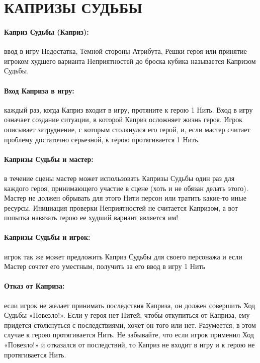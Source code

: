 \section{КАПРИЗЫ СУДЬБЫ}
\paragraph{Каприз Судьбы (Каприз):} ввод в игру Недостатка, Темной стороны Атрибута, Решки героя или принятие игроком худшего варианта Неприятностей до броска кубика называется Капризом Судьбы.
\paragraph{Вход Каприза в игру:} каждый раз, когда Каприз входит в игру, протяните к герою 1 Нить. Вход в игру означает создание ситуации, в которой Каприз осложняет жизнь героя. Игрок описывает затруднение, с которым столкнулся его герой, и, если мастер считает проблему достаточно серьезной, к герою протягивается 1 Нить.
\paragraph{Капризы Судьбы и мастер:} в течение сцены мастер может использовать Капризы Судьбы один раз для каждого героя, принимающего участие в сцене (хоть и не обязан делать этого). Мастер не должен обрывать для этого Нити персон или тратить какие-то иные ресурсы. Инициация проверки Неприятностей не считается Капризом, а вот попытка навязать герою ее худший вариант является им!


\paragraph{Капризы Судьбы и игрок:} игрок так же может предложить Каприз Судьбы для своего персонажа и если Мастер сочтет его уместным, получить за его ввод в игру 1 Нить


\paragraph{Отказ от Каприза:} если игрок не желает принимать последствия Каприза, он должен совершить Ход Судьбы «Повезло!». Если у героя нет Нитей, чтобы откупиться от Каприза, ему придется столкнуться с последствиями, хочет он того или нет. Разумеется, в этом случае к герою протягивается Нить. Не забывайте, что если игрок применил Ход «Повезло!» и отказался от последствий, то Каприз не входит в игру и к герою не протягивается Нить.